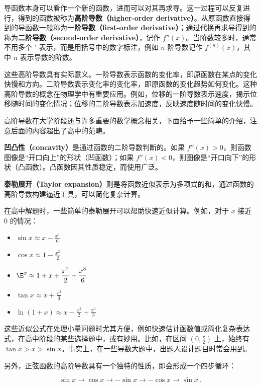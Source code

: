 导函数本身可以看作一个新的函数，进而可以对其再求导。这一过程可以反复进行，得到的函数被称为\textbf{高阶导数（higher-order derivative）}。从原函数直接得到的导函数一般称为\textbf{一阶导数（first-order derivative）}；通过代换再求导得到的称为\textbf{二阶导数（second-order derivative）}，记作 $f''(x)$。当阶数较多时，通常不用多个 $'$ 表示，而是用括号中的数字标注，例如 $n$ 阶导数记作 $f^{(n)}(x)$，其中 $n$ 表示导数的阶数。

这些高阶导数具有实际意义。一阶导数表示函数的变化率，即原函数在某点的变化快慢和方向。二阶导数表示变化率的变化率，即原函数的变化趋势如何变化。这种高阶导数的概念在物理学中有重要应用。例如，位移的一阶导数表示速度，揭示位移随时间的变化情况；位移的二阶导数表示加速度，反映速度随时间的变化快慢。

高阶导数在大学阶段还与许多重要的数学概念相关，下面给予一些简单的介绍，注意后面的内容超出了高中的范畴。

\textbf{凹凸性（concavity）}是通过函数的二阶导数判断的。如果 $f''(x) > 0$，则函数图像是“开口向上”的形状（凹函数）；如果 $f''(x) < 0$，则图像是“开口向下”的形状（凸函数）。凸函数因其性质稳定，而使用广泛。

\textbf{泰勒展开（Taylor expansion）}则是将函数近似表示为多项式的和，通过函数的高阶导数构建逼近工具，可以简化复杂计算。

在高中解题时，一些简单的泰勒展开可以帮助快速近似计算。例如，对于 $x$ 接近 $0$ 的情况：
\begin{itemize}
\item $\displaystyle\sin x \approx x - \frac{x^3}{6}$
\item $\displaystyle\cos x \approx 1 - \frac{x^2}{2}$
\item $\displaystyle \E^x \approx 1 + x + \frac{x^2}{2} + \frac{x^3}{6}$
\item $\displaystyle\tan x \approx x + \frac{x^3}{3}$
\item $\displaystyle\ln (1 + x) \approx x - \frac{x^2}{2} + \frac{x^3}{3}$
\end{itemize}

这些近似公式在处理小量问题时尤其方便，例如快速估计函数值或简化复杂表达式，在高中阶段的某些选择题中，或有妙用。比如，在区间 $(0, \frac{\pi}{2})$ 上，始终有 $\tan x > x > \sin x$。事实上，在一些导数大题中，出题人设计题目时常会用到。

另外，正弦函数的高阶导数具有一个独特的性质，即会形成一个四步循环：

\begin{equation}
\sin x \to \cos x \to -\sin x \to -\cos x \to \sin x~.
\end{equation}

